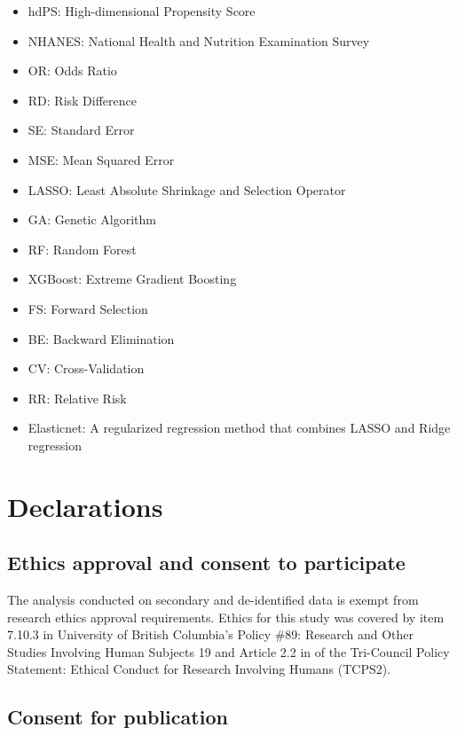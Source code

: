 \documentclass[sn-vancouver,Numbered,lineno,pdflatex]{sn-jnl}
\providecommand{\tightlist}{%
  \setlength{\itemsep}{0pt}\setlength{\parskip}{0pt}}
\begin{document}
\begin{itemize}
\tightlist
\item
  hdPS: High-dimensional Propensity Score
\item
  NHANES: National Health and Nutrition Examination Survey
\item
  OR: Odds Ratio
\item
  RD: Risk Difference
\item
  SE: Standard Error
\item
  MSE: Mean Squared Error
\item
  LASSO: Least Absolute Shrinkage and Selection Operator
\item
  GA: Genetic Algorithm
\item
  RF: Random Forest
\item
  XGBoost: Extreme Gradient Boosting
\item
  FS: Forward Selection
\item
  BE: Backward Elimination
\item
  CV: Cross-Validation
\item
  RR: Relative Risk
\item
  Elasticnet: A regularized regression method that combines LASSO and
  Ridge regression
\end{itemize}

\section*{Declarations}\label{declarations}

\subsection*{Ethics approval and consent to
participate}\label{ethics-approval-and-consent-to-participate}

The analysis conducted on secondary and de-identified data is exempt
from research ethics approval requirements. Ethics for this study was
covered by item 7.10.3 in University of British Columbia's Policy \#89:
Research and Other Studies Involving Human Subjects 19 and Article 2.2
in of the Tri-Council Policy Statement: Ethical Conduct for Research
Involving Humans (TCPS2).

\subsection*{Consent for publication}\label{consent-for-publication}
\end{document}
